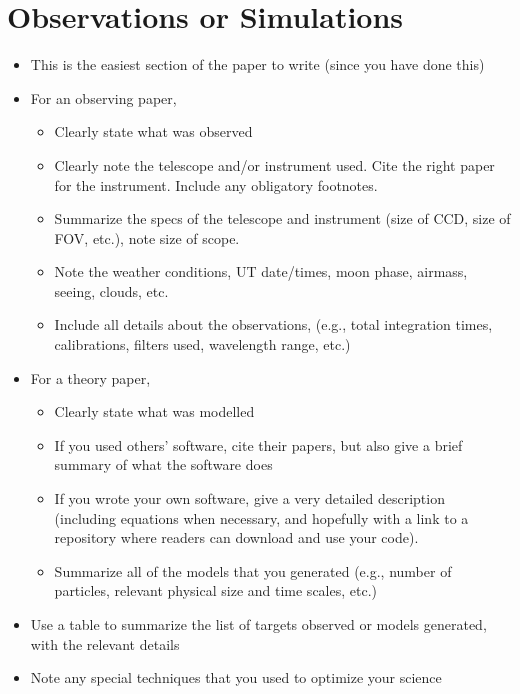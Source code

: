 \documentclass[twocolumn]{aastex61}
\begin{document}
\section{Observations or Simulations}
\begin{itemize}\itemsep0em
\item This is the easiest section of the paper to write (since you have done this)
\item For an observing paper, 
\begin{itemize}\itemsep0em
\item Clearly state what was observed 
\item Clearly note the telescope and/or instrument used. Cite the right paper for the instrument.  Include any obligatory footnotes.
\item Summarize the specs of the telescope and instrument (size of CCD, size of FOV, etc.), note size of scope.
\item Note the weather conditions, UT date/times, moon phase, airmass, seeing, clouds, etc.
\item Include all details about the observations, (e.g., total integration times, calibrations, filters used, wavelength range, etc.) 
\end{itemize}
\item For a theory paper,
\begin{itemize}\itemsep0em
\item Clearly state what was modelled
\item If you used others' software, cite their papers, but also give a brief summary of what the software does
\item If you wrote your own software, give a very detailed description (including equations when necessary, and hopefully with a link to a repository where readers can download and use your code).
\item Summarize all of the models that you generated (e.g., number of particles, relevant physical size and time scales, etc.)
\end{itemize}
\item Use a table to summarize the list of targets observed or models generated, with the relevant details
\item Note any special techniques that you used to optimize your science 
\end{itemize}
\end{document}
